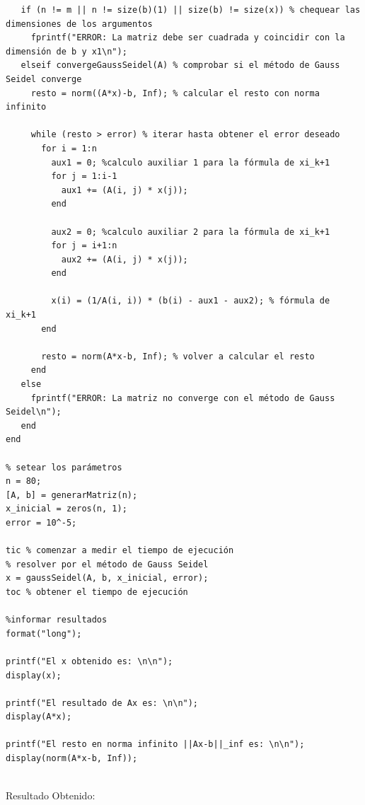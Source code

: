 \documentclass{article}
\begin{document}
\begin{lstlisting}
   if (n != m || n != size(b)(1) || size(b) != size(x)) % chequear las dimensiones de los argumentos
     fprintf("ERROR: La matriz debe ser cuadrada y coincidir con la dimensión de b y x1\n");
   elseif convergeGaussSeidel(A) % comprobar si el método de Gauss Seidel converge
     resto = norm((A*x)-b, Inf); % calcular el resto con norma infinito

     while (resto > error) % iterar hasta obtener el error deseado
       for i = 1:n
         aux1 = 0; %calculo auxiliar 1 para la fórmula de xi_k+1
         for j = 1:i-1
           aux1 += (A(i, j) * x(j));
         end

         aux2 = 0; %calculo auxiliar 2 para la fórmula de xi_k+1
         for j = i+1:n
           aux2 += (A(i, j) * x(j));
         end

         x(i) = (1/A(i, i)) * (b(i) - aux1 - aux2); % fórmula de xi_k+1
       end

       resto = norm(A*x-b, Inf); % volver a calcular el resto
     end
   else
     fprintf("ERROR: La matriz no converge con el método de Gauss Seidel\n");
   end
end

% setear los parámetros
n = 80;
[A, b] = generarMatriz(n);
x_inicial = zeros(n, 1);
error = 10^-5;

tic % comenzar a medir el tiempo de ejecución
% resolver por el método de Gauss Seidel
x = gaussSeidel(A, b, x_inicial, error);
toc % obtener el tiempo de ejecución

%informar resultados
format("long");

printf("El x obtenido es: \n\n");
display(x);

printf("El resultado de Ax es: \n\n");
display(A*x);

printf("El resto en norma infinito ||Ax-b||_inf es: \n\n");
display(norm(A*x-b, Inf));
\end{lstlisting}\\

Resultado Obtenido:
\end{document}
